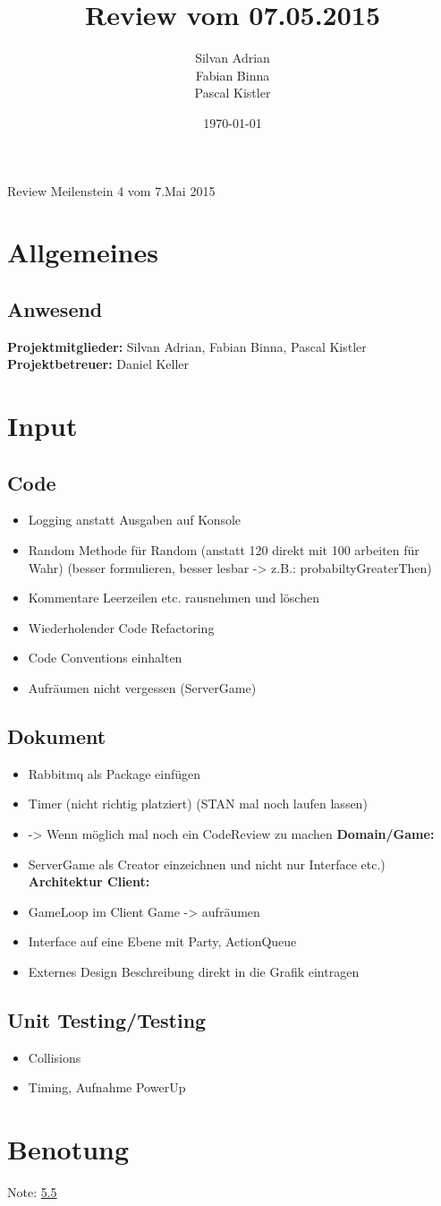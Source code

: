 \documentclass[11pt]{scrartcl}
\title{Review vom 07.05.2015}
\author{Silvan Adrian \\ Fabian Binna \\ Pascal Kistler}
\date{\today{}}
\begin{document}
{\huge Review Meilenstein 4 vom 7.Mai 2015}

\section{Allgemeines}
\label{sec:Allgemein}

\subsection{Anwesend}
\label{sec:Anwesend}
\textbf{Projektmitglieder:} Silvan Adrian, Fabian Binna, Pascal Kistler \\
\textbf{Projektbetreuer:} Daniel Keller
\section{Input}
\subsection{Code}
\begin{itemize}
 \item Logging anstatt Ausgaben auf Konsole
 \item Random Methode für Random (anstatt 120 direkt mit 100 arbeiten für Wahr) (besser formulieren, besser lesbar -> z.B.: probabiltyGreaterThen)
 \item Kommentare Leerzeilen etc. rausnehmen und löschen
 \item Wiederholender Code Refactoring
 \item Code Conventions einhalten
 \item Aufräumen nicht vergessen (ServerGame)
\end{itemize}

\subsection{Dokument}
\begin{itemize}
  \item Rabbitmq als Package einfügen
  \item Timer (nicht richtig platziert) (STAN mal noch laufen lassen) 
  \item -> Wenn möglich mal noch ein CodeReview zu machen
  \newline
  \textbf{Domain/Game:} 
  \item ServerGame als Creator einzeichnen und 
  nicht nur Interface etc.)
  \newline
  \textbf{Architektur Client:}
    \item GameLoop im Client Game -> aufräumen
    \item Interface auf eine Ebene mit Party, ActionQueue
    \item Externes Design Beschreibung direkt in die Grafik eintragen
\end{itemize}

\subsection{Unit Testing/Testing}
\begin{itemize}
   \item Collisions
   \item Timing, Aufnahme PowerUp
\end{itemize}


\section{Benotung}
\label{sec:Benotung}
Note: \underline {5.5}
\end{document}
